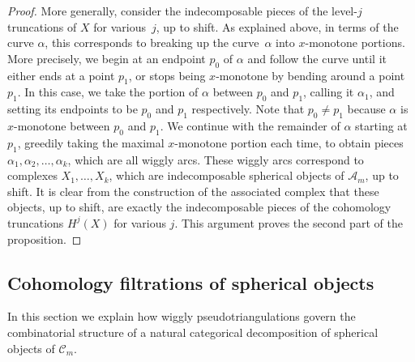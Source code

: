 \documentclass{amsart}
\theoremstyle{definition}
\begin{document}
\begin{proof}
  More generally, consider the indecomposable pieces of the level-\(j\) truncations of \(X\) for various~\(j\), up to shift.
  As explained above, in terms of the curve \(\alpha\), this corresponds to breaking up the curve~\(\alpha\) into \(x\)-monotone portions.
  More precisely, we begin at an endpoint \(p_0\) of \(\alpha\) and follow the curve until it either ends at a point \(p_1\), or stops being \(x\)-monotone by bending around a point \(p_1\).
  In this case, we take the portion of \(\alpha\) between \(p_0\) and \(p_1\), calling it \(\alpha_1\), and setting its endpoints to be \(p_0\) and \(p_1\) respectively.
  Note that \(p_0 \neq p_1\) because \(\alpha\) is \(x\)-monotone between \(p_0\) and \(p_1\).
  We continue with the remainder of \(\alpha\) starting at \(p_1\), greedily taking the maximal \(x\)-monotone portion each time, to obtain pieces \(\alpha_1,\alpha_2, \ldots, \alpha_k\), which are all wiggly arcs.
  These wiggly arcs correspond to complexes \(X_1, \ldots, X_k\), which are indecomposable spherical objects of \(\mathcal{A}_m\), up to shift.
  It is clear from the construction of the associated complex that these objects, up to shift, are exactly the indecomposable pieces of the cohomology truncations \(H^j(X)\) for various \(j\).
  This argument proves the second part of the proposition.
\end{proof}

\subsection{Cohomology filtrations of spherical objects}
In this section we explain how wiggly pseudotriangulations govern the combinatorial structure of a natural categorical decomposition of spherical objects of \(\mathcal{C}_m\).
\end{document}
